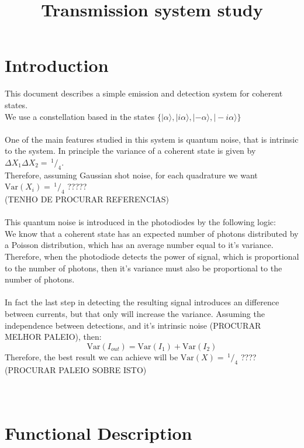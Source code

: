 \documentclass[a4paper]{article}
\title{Transmission system study}
\author{}
\date{}
\newcommand{\ket}[1]{|#1\rangle}
\newcommand{\slantfrac}[2]{\,^{#1}\!/_{#2}}
\begin{document}
\maketitle

\section{Introduction}\label{sec:intro}

This document describes a simple emission and detection system for coherent states.\\
We use a constellation based in the states $\{ \ket{\alpha}, \ket{i\alpha}, \ket{ - \alpha}, \ket{ - i \alpha} \}$\\
\\
One of the main features studied in this system is quantum noise, that is intrinsic to the system. In principle  the variance of a coherent state is given by $\Delta X_1 \Delta X_2 = \slantfrac{1}{4}$.\\
Therefore, assuming Gaussian shot noise, for each quadrature we want $\textrm{Var}(X_i) = \slantfrac{1}{4}$ ?????\\
(TENHO DE PROCURAR REFERENCIAS)
\\
\\
This quantum noise is introduced in the photodiodes by the following logic:\\
We know that a coherent state has an expected number of photons distributed by a Poisson distribution, which has an average number equal to it's variance. Therefore, when the photodiode detects the power of signal, which is proportional to the number of photons, then it's variance must also be proportional to the number of photons.\\
\\
In fact the last step in detecting the resulting signal introduces an difference between currents, but that only will increase the variance. Assuming the independence between detections, and it's intrinsic noise (PROCURAR MELHOR PALEIO), then:
$$
\textrm{Var}(I_{out}) = \textrm{Var}(I_1) + \textrm{Var}(I_2)
$$
Therefore, the best result we can achieve will be $\textrm{Var}(X) = \slantfrac{1}{4}$ ???? (PROCURAR PALEIO SOBRE ISTO)\\
\\
\\
\section{Functional Description}
\end{document}
